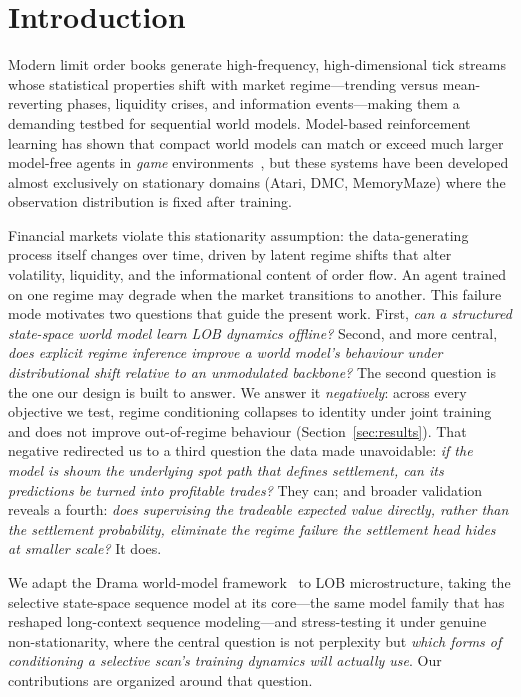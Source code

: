 \documentclass{article}
\begin{document}
\section{Introduction}\label{sec:intro}

Modern limit order books generate high-frequency, high-dimensional tick
streams whose statistical properties shift with market regime---trending
versus mean-reverting phases, liquidity crises, and information
events---making them a demanding testbed for sequential world models.
Model-based reinforcement learning has shown that compact world models
can match or exceed much larger model-free agents in \emph{game}
environments~\citep{wang2024drama, hafner2023dreamerv3}, but these
systems have been developed almost exclusively on stationary domains
(Atari, DMC, MemoryMaze) where the observation distribution is fixed
after training.

Financial markets violate this stationarity assumption: the
data-generating process itself changes over time, driven by latent
regime shifts that alter volatility, liquidity, and the informational
content of order flow.  An agent trained on one regime may degrade when
the market transitions to another.  This failure mode motivates two
questions that guide the present work.  First, \emph{can a structured
state-space world model learn LOB dynamics offline?}  Second, and more
central, \emph{does explicit regime inference improve a world model's
behaviour under distributional shift relative to an unmodulated
backbone?}  The second question is the one our design is built to
answer.  We answer it \emph{negatively}: across every objective we test,
regime conditioning collapses to identity under joint training and does
not improve out-of-regime behaviour (Section~\ref{sec:results}).  That
negative redirected us to a third question the data made unavoidable:
\emph{if the model is shown the underlying spot path that defines
settlement, can its predictions be turned into profitable trades?}  They
can; and broader validation reveals a fourth: \emph{does supervising the
tradeable expected value directly, rather than the settlement probability,
eliminate the regime failure the settlement head hides at smaller scale?}
It does.

We adapt the Drama world-model framework~\citep{wang2024drama} to LOB
microstructure, taking the selective state-space sequence model at its
core---the same model family that has reshaped long-context sequence
modeling---and stress-testing it under genuine non-stationarity, where the
central question is not perplexity but \emph{which forms of conditioning a
selective scan's training dynamics will actually use}.  Our contributions
are organized around that question.
\end{document}
